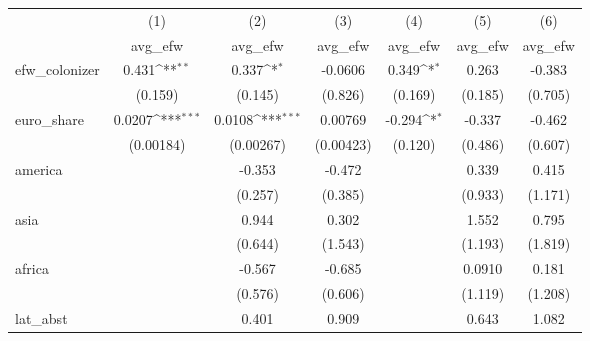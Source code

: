 {
\def\sym#1{\ifmmode^{#1}\else\(^{#1}\)\fi}
\begin{tabular}{l*{6}{c}}
\hline\hline
            &\multicolumn{1}{c}{(1)}&\multicolumn{1}{c}{(2)}&\multicolumn{1}{c}{(3)}&\multicolumn{1}{c}{(4)}&\multicolumn{1}{c}{(5)}&\multicolumn{1}{c}{(6)}\\
            &\multicolumn{1}{c}{avg\_efw}&\multicolumn{1}{c}{avg\_efw}&\multicolumn{1}{c}{avg\_efw}&\multicolumn{1}{c}{avg\_efw}&\multicolumn{1}{c}{avg\_efw}&\multicolumn{1}{c}{avg\_efw}\\
\hline
efw\_colonizer&       0.431\sym{**} &       0.337\sym{*}  &     -0.0606         &       0.349\sym{*}  &       0.263         &      -0.383         \\
            &     (0.159)         &     (0.145)         &     (0.826)         &     (0.169)         &     (0.185)         &     (0.705)         \\
[1em]
euro\_share  &      0.0207\sym{***}&      0.0108\sym{***}&     0.00769         &      -0.294\sym{*}  &      -0.337         &      -0.462         \\
            &   (0.00184)         &   (0.00267)         &   (0.00423)         &     (0.120)         &     (0.486)         &     (0.607)         \\
[1em]
america     &                     &      -0.353         &      -0.472         &                     &       0.339         &       0.415         \\
            &                     &     (0.257)         &     (0.385)         &                     &     (0.933)         &     (1.171)         \\
[1em]
asia        &                     &       0.944         &       0.302         &                     &       1.552         &       0.795         \\
            &                     &     (0.644)         &     (1.543)         &                     &     (1.193)         &     (1.819)         \\
[1em]
africa      &                     &      -0.567         &      -0.685         &                     &      0.0910         &       0.181         \\
            &                     &     (0.576)         &     (0.606)         &                     &     (1.119)         &     (1.208)         \\
[1em]
lat\_abst    &                     &       0.401         &       0.909         &                     &       0.643         &       1.082         \\

\end{tabular}}
